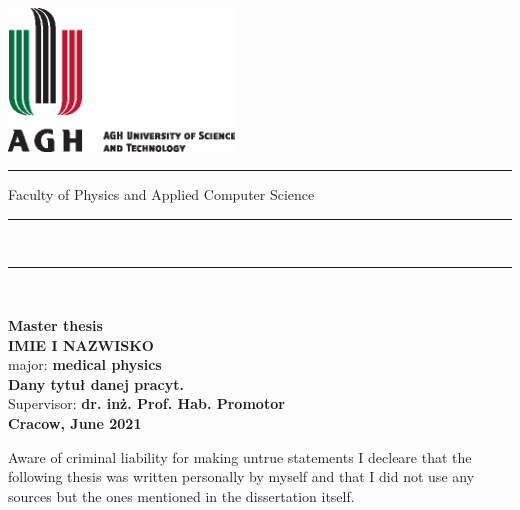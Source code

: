 \thispagestyle{empty}
\includegraphics[height=38.0mm]{Import/agh_nzw_a_en_2w_wbr_pms.eps}\\
\rule{30.2mm}{0pt}
{\small\textsf{Faculty of Physics and Applied Computer Science}}\\
\rule{\textwidth}{3pt}\\
\rule[2ex]
{\textwidth}{1pt}\\
\vspace{6ex}
\begin{center}
{\LARGE \bf \textsf{Master thesis}}\\
\vspace{12ex}
{\bf\Large\textsf{IMIE I NAZWISKO}}\\
\vspace{12ex}
{\small \sf major: {\bf \textsf{medical physics}}}\\
\vspace{12ex}
{\bf \huge \textsf{Dany tytuł danej pracyt.}}\\
\vspace{12ex}
{\Large \sf Supervisor: {\bf \textsf{dr. inż. Prof. Hab. Promotor }}}\\
\vspace*{\fill}
{\large \bf \textsf{Cracow, June 2021}}
\end{center}

\newpage

Aware of criminal liability for making untrue statements I decleare that
the following thesis was written personally by myself and that I did not use
any sources but the ones mentioned in the dissertation itself.

\newpage

